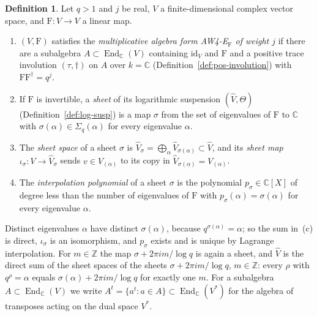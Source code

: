 \documentclass[11pt]{amsart}
\theoremstyle{plain}
\theoremstyle{definition}
\newtheorem{definition}[theorem]{Definition}
\theoremstyle{remark}
\numberwithin{equation}{section}
\newcommand{\C}{\mathbb{C}}
\newcommand{\Z}{\mathbb{Z}}
\begin{document}
\begin{definition}\label{def:aw4-EF}
Let $q>1$ and $j$ be real, $V$ a finite-dimensional complex vector
space, and $\mathrm{F}:V\to V$ a linear map.
\begin{enumerate}[label=(\alph*)]
\item $(V,\mathrm{F})$ satisfies the \emph{multiplicative algebra form
  AW4-E$_{\mathrm F}$ of weight $j$} if there are a subalgebra
  $A\subset\operatorname{End}_\C(V)$ containing $\mathrm{id}_V$ and
  $\mathrm{F}$ and a positive trace involution $(\tau,\dagger)$ on $A$
  over $k=\C$ (Definition~\ref{def:pos-involution}) with
  $\mathrm{F}\mathrm{F}^\dagger=q^j$.
\item If $\mathrm{F}$ is invertible, a \emph{sheet} of its logarithmic
  suspension $(\widehat V,\Theta)$ (Definition~\ref{def:log-susp}) is a
  map $\sigma$ from the set of eigenvalues of $\mathrm{F}$ to $\C$ with
  $\sigma(\alpha)\in\Sigma_q(\alpha)$ for every eigenvalue $\alpha$.
\item The \emph{sheet space} of a sheet $\sigma$ is
  $\widehat V_\sigma=\bigoplus_\alpha\widehat V_{\sigma(\alpha)}\subset
  \widehat V$, and its \emph{sheet map} $\iota_\sigma:V\to\widehat
  V_\sigma$ sends $v\in V_{(\alpha)}$ to its copy in
  $\widehat V_{\sigma(\alpha)}=V_{(\alpha)}$.
\item The \emph{interpolation polynomial} of a sheet $\sigma$ is the
  polynomial $p_\sigma\in\C[X]$ of degree less than the number of
  eigenvalues of $\mathrm{F}$ with $p_\sigma(\alpha)=\sigma(\alpha)$ for
  every eigenvalue $\alpha$.
\end{enumerate}
\end{definition}

Distinct eigenvalues $\alpha$ have distinct $\sigma(\alpha)$, because
$q^{\sigma(\alpha)}=\alpha$; so the sum in~(c) is direct, $\iota_\sigma$
is an isomorphism, and $p_\sigma$ exists and is unique by Lagrange
interpolation. For $m\in\Z$ the map $\sigma+2\pi im/\log q$ is again a
sheet, and $\widehat V$ is the direct sum of the sheet spaces of the
sheets $\sigma+2\pi im/\log q$, $m\in\Z$: every $\rho$ with
$q^\rho=\alpha$ equals $\sigma(\alpha)+2\pi im/\log q$ for exactly one
$m$. For a subalgebra $A\subset\operatorname{End}_\C(V)$ we write
$A^t=\{a^t:a\in A\}\subset\operatorname{End}_\C(V^*)$ for the algebra of
transposes acting on the dual space $V^*$.
\end{document}
